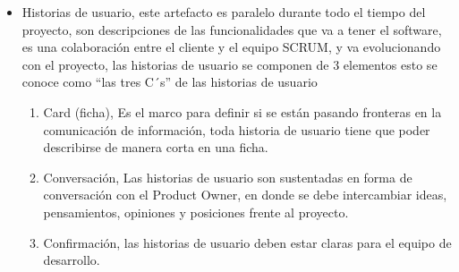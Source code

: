 \begin{itemize}
     \item Historias de usuario, este artefacto es paralelo durante todo el tiempo del proyecto, son descripciones de las funcionalidades que va a tener el software, es una colaboración entre el cliente y el equipo SCRUM, y va evolucionando con el proyecto, las historias de usuario se componen de 3 elementos esto se conoce como “las tres C´s” de las historias de usuario
	    \begin{enumerate}
	        \item Card (ficha), Es el marco para definir si se están pasando fronteras en la comunicación de información, toda historia de usuario tiene que poder describirse de manera corta en una ficha.
            \item Conversación, Las historias de usuario son sustentadas en forma de conversación con el Product Owner, en donde se debe intercambiar ideas, pensamientos, opiniones y posiciones frente al proyecto.
            \item Confirmación, las historias de usuario deben estar claras para el equipo de desarrollo.
    	 \end{enumerate}

 \end{itemize}